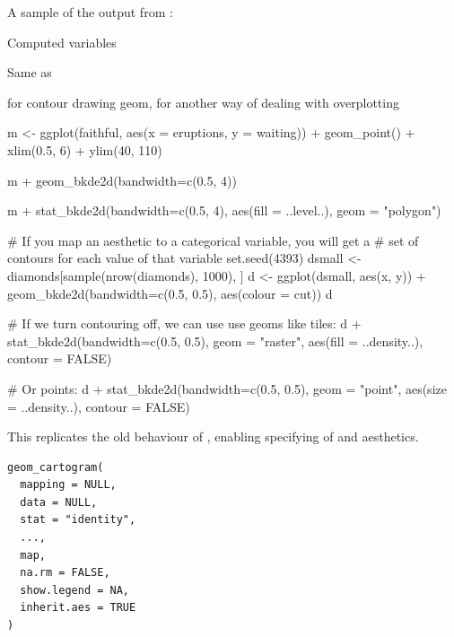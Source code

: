 \documentclass[a4paper]{book}
\begin{document}
%
\begin{Details}



A sample of the output from :


\end{Details}
%
\begin{Section}{Computed variables}

Same as 
\end{Section}
%
\begin{SeeAlso}
 for contour drawing geom,
 for another way of dealing with overplotting
\end{SeeAlso}
%
\begin{Examples}
\begin{ExampleCode}
m <- ggplot(faithful, aes(x = eruptions, y = waiting)) +
       geom_point() +
       xlim(0.5, 6) +
       ylim(40, 110)

m + geom_bkde2d(bandwidth=c(0.5, 4))

m + stat_bkde2d(bandwidth=c(0.5, 4), aes(fill = ..level..), geom = "polygon")

# If you map an aesthetic to a categorical variable, you will get a
# set of contours for each value of that variable
set.seed(4393)
dsmall <- diamonds[sample(nrow(diamonds), 1000), ]
d <- ggplot(dsmall, aes(x, y)) +
       geom_bkde2d(bandwidth=c(0.5, 0.5), aes(colour = cut))
d

# If we turn contouring off, we can use use geoms like tiles:
d + stat_bkde2d(bandwidth=c(0.5, 0.5), geom = "raster",
                aes(fill = ..density..), contour = FALSE)

# Or points:
d + stat_bkde2d(bandwidth=c(0.5, 0.5), geom = "point",
                aes(size = ..density..),  contour = FALSE)
\end{ExampleCode}
\end{Examples}
%
\begin{Description}
This replicates the old behaviour of , enabling specifying of
 and  aesthetics.
\end{Description}
%
\begin{Usage}
\begin{verbatim}
geom_cartogram(
  mapping = NULL,
  data = NULL,
  stat = "identity",
  ...,
  map,
  na.rm = FALSE,
  show.legend = NA,
  inherit.aes = TRUE
)
\end{verbatim}
\end{Usage}
\end{document}
